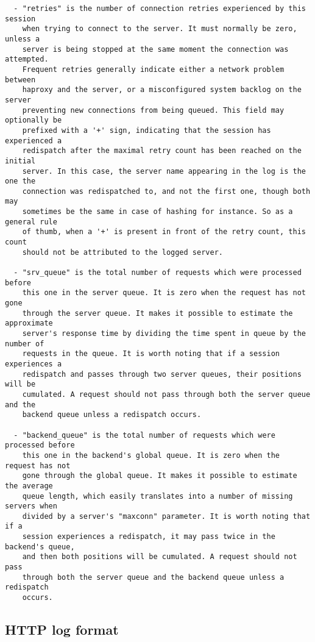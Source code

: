 \begin{verbatim}
  - "retries" is the number of connection retries experienced by this session
    when trying to connect to the server. It must normally be zero, unless a
    server is being stopped at the same moment the connection was attempted.
    Frequent retries generally indicate either a network problem between
    haproxy and the server, or a misconfigured system backlog on the server
    preventing new connections from being queued. This field may optionally be
    prefixed with a '+' sign, indicating that the session has experienced a
    redispatch after the maximal retry count has been reached on the initial
    server. In this case, the server name appearing in the log is the one the
    connection was redispatched to, and not the first one, though both may
    sometimes be the same in case of hashing for instance. So as a general rule
    of thumb, when a '+' is present in front of the retry count, this count
    should not be attributed to the logged server.

  - "srv_queue" is the total number of requests which were processed before
    this one in the server queue. It is zero when the request has not gone
    through the server queue. It makes it possible to estimate the approximate
    server's response time by dividing the time spent in queue by the number of
    requests in the queue. It is worth noting that if a session experiences a
    redispatch and passes through two server queues, their positions will be
    cumulated. A request should not pass through both the server queue and the
    backend queue unless a redispatch occurs.

  - "backend_queue" is the total number of requests which were processed before
    this one in the backend's global queue. It is zero when the request has not
    gone through the global queue. It makes it possible to estimate the average
    queue length, which easily translates into a number of missing servers when
    divided by a server's "maxconn" parameter. It is worth noting that if a
    session experiences a redispatch, it may pass twice in the backend's queue,
    and then both positions will be cumulated. A request should not pass
    through both the server queue and the backend queue unless a redispatch
    occurs.
\end{verbatim}

\subsection{HTTP log format}

